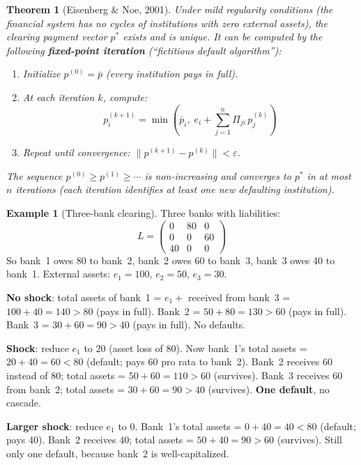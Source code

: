 \documentclass[11pt, a4paper]{article}
\theoremstyle{definition}
\newtheorem{example}{Example}[section]
\theoremstyle{plain}
\newtheorem{theorem}{Theorem}[section]
\theoremstyle{remark}
\begin{document}
\begin{theorem}[Eisenberg \& Noe, 2001]\label{thm:eisenberg-noe}
Under mild regularity conditions (the financial system has no cycles of institutions
with zero external assets), the clearing payment vector $p^*$ exists and is unique.
It can be computed by the following \textbf{fixed-point iteration} (``fictitious
default algorithm''):

\begin{enumerate}
    \item Initialize $p^{(0)} = \bar{p}$ (every institution pays in full).
    \item At each iteration $k$, compute:
    \[
        p_i^{(k+1)} = \min\!\left(\bar{p}_i,\; e_i + \sum_{j=1}^{n} \Pi_{ji}\, p_j^{(k)}\right)
    \]
    \item Repeat until convergence: $\|p^{(k+1)} - p^{(k)}\| < \varepsilon$.
\end{enumerate}

The sequence $p^{(0)} \geq p^{(1)} \geq \cdots$ is non-increasing and converges
to $p^*$ in at most $n$ iterations (each iteration identifies at least one new
defaulting institution).
\end{theorem}

\begin{example}[Three-bank clearing]\label{ex:three-bank}
Three banks with liabilities:
\[
    L = \begin{pmatrix} 0 & 80 & 0 \\ 0 & 0 & 60 \\ 40 & 0 & 0 \end{pmatrix}
\]
So bank~1 owes 80 to bank~2, bank~2 owes 60 to bank~3, bank~3 owes 40 to bank~1.
External assets: $e_1 = 100$, $e_2 = 50$, $e_3 = 30$.

\textbf{No shock}: total assets of bank~1 = $e_1 + $ received from bank~3 = $100 + 40 = 140 > 80$
(pays in full).
Bank~2 = $50 + 80 = 130 > 60$ (pays in full).
Bank~3 = $30 + 60 = 90 > 40$ (pays in full).
No defaults.

\textbf{Shock}: reduce $e_1$ to 20 (asset loss of 80).
Now bank~1's total assets = $20 + 40 = 60 < 80$ (default; pays 60 pro rata to bank~2).
Bank~2 receives 60 instead of 80; total assets = $50 + 60 = 110 > 60$ (survives).
Bank~3 receives 60 from bank~2; total assets = $30 + 60 = 90 > 40$ (survives).
\textbf{One default}, no cascade.

\textbf{Larger shock}: reduce $e_1$ to 0.
Bank~1's total assets = $0 + 40 = 40 < 80$ (default; pays 40).
Bank~2 receives 40; total assets = $50 + 40 = 90 > 60$ (survives).
Still only one default, because bank~2 is well-capitalized.
\end{example}
\end{document}
